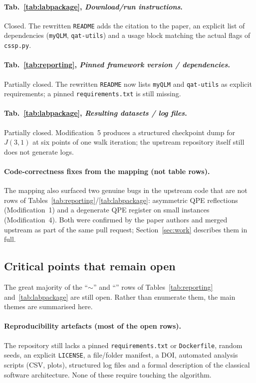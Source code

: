 \documentclass[11pt,a4paper]{article}
\begin{document}
\paragraph{Tab.~\ref{tab:labpackage}, \emph{Download/run instructions}.}
Closed. The rewritten \texttt{README} adds the citation to the
paper, an explicit list of dependencies (\texttt{myQLM},
\texttt{qat-utils}) and a usage block matching the actual flags of
\texttt{cssp.py}.

\paragraph{Tab.~\ref{tab:reporting}, \emph{Pinned framework version
/ dependencies}.}
Partially closed. The rewritten \texttt{README} now lists
\texttt{myQLM} and \texttt{qat-utils} as explicit requirements; a
pinned \texttt{requirements.txt} is still missing.

\paragraph{Tab.~\ref{tab:labpackage}, \emph{Resulting datasets /
log files}.}
Partially closed. Modification~5 produces a structured checkpoint
dump for $J(3,1)$ at six points of one walk iteration; the
upstream repository itself still does not generate logs.

\paragraph{Code-correctness fixes from the mapping (not table rows).}
The mapping also surfaced two genuine bugs in the upstream code
that are not rows of Tables~\ref{tab:reporting}/\ref{tab:labpackage}:
asymmetric QPE reflections (Modification~1) and a degenerate QPE
register on small instances (Modification~4). Both were confirmed
by the paper authors and merged upstream as part of the same pull
request; Section~\ref{sec:work} describes them in full.

\subsection{Critical points that remain open}

The great majority of the ``$\sim$'' and ``'' rows of
Tables~\ref{tab:reporting} and~\ref{tab:labpackage} are still
open. Rather than enumerate them, the main themes are summarised
here.

\paragraph{Reproducibility artefacts (most of the open rows).}
The repository still lacks a pinned \texttt{requirements.txt} or
\texttt{Dockerfile}, random seeds, an explicit \texttt{LICENSE},
a file/folder manifest, a DOI, automated analysis scripts (CSV,
plots), structured log files and a formal description of the
classical software architecture. None of these require touching
the algorithm.
\end{document}
